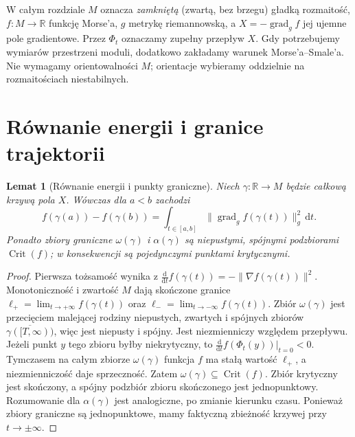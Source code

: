 \documentclass[11pt,a4paper,oneside]{report}
\newcommand{\R}{\mathbb{R}}
\newcommand{\dd}{\mathrm d}
\theoremstyle{plain}
\newtheorem{lemat}[twierdzenie]{Lemat}
\theoremstyle{definition}
\theoremstyle{remark}
\begin{document}
W całym rozdziale $M$ oznacza \emph{zamkniętą} (zwartą, bez brzegu)
gładką rozmaitość, $f:M\to\R$ funkcję Morse'a, $g$ metrykę
riemannowską, a $X=-\operatorname{grad}_g f$ jej ujemne pole
gradientowe. Przez $\Phi_t$ oznaczamy zupełny przepływ $X$.
Gdy potrzebujemy wymiarów przestrzeni moduli, dodatkowo zakładamy
warunek Morse'a--Smale'a. Nie wymagamy orientowalności $M$;
orientacje wybieramy oddzielnie na rozmaitościach niestabilnych.

\section{Równanie energii i granice trajektorii}
\begin{lemat}[Równanie energii i punkty graniczne]
\label{lem:morse-energy-analytic-v11}
Niech $\gamma:\R\to M$ będzie całkową krzywą pola $X$.
Wówczas dla $a<b$ zachodzi
\[
 f(\gamma(a))-f(\gamma(b))=
 \int_{t\in[a,b]}\|\operatorname{grad}_g f(\gamma(t))\|_g^2\,\dd t.
\]
Ponadto zbiory graniczne $\omega(\gamma)$ i $\alpha(\gamma)$ są
niepustymi, spójnymi podzbiorami $\operatorname{Crit}(f)$;
w konsekwencji są pojedynczymi punktami krytycznymi.
\end{lemat}
\begin{proof}
Pierwsza tożsamość wynika z
$\tfrac{\dd}{\dd t}f(\gamma(t))=-\|\nabla f(\gamma(t))\|^2$.
Monotoniczność i zwartość $M$ dają skończone granice
$\ell_+=\lim_{t\to+\infty}f(\gamma(t))$ oraz
$\ell_-=\lim_{t\to-\infty}f(\gamma(t))$.
Zbiór $\omega(\gamma)$ jest przecięciem malejącej rodziny
niepustych, zwartych i spójnych zbiorów
$\overline{\gamma([T,\infty))}$, więc jest niepusty i spójny.
Jest niezmienniczy względem przepływu. Jeżeli punkt $y$ tego
zbioru byłby niekrytyczny, to
$\tfrac{\dd}{\dd t}f(\Phi_t(y))|_{t=0}<0$.
Tymczasem na całym zbiorze $\omega(\gamma)$ funkcja $f$
ma stałą wartość $\ell_+$, a niezmienniczość daje sprzeczność.
Zatem $\omega(\gamma)\subseteq\operatorname{Crit}(f)$.
Zbiór krytyczny jest skończony, a spójny podzbiór zbioru
skończonego jest jednopunktowy. Rozumowanie dla $\alpha(\gamma)$
jest analogiczne, po zmianie kierunku czasu. Ponieważ zbiory
graniczne są jednopunktowe, mamy faktyczną zbieżność krzywej
przy $t\to\pm\infty$.
\end{proof}
\end{document}
